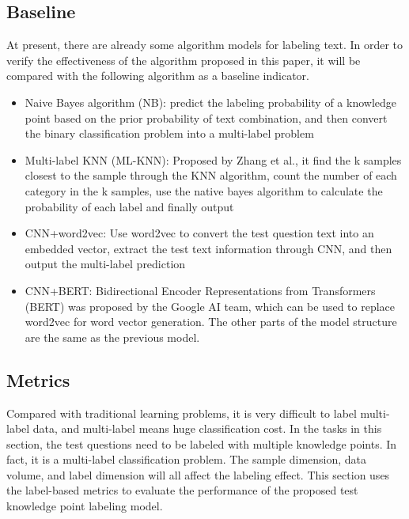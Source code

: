 \subsection{Baseline}
At present, there are already some algorithm models for labeling text. In order to verify the effectiveness of the algorithm proposed in this paper, it will be compared with the following algorithm as a baseline indicator.
\begin{itemize}
	\item Naive Bayes algorithm (NB): predict the labeling probability of a knowledge point based on the prior probability of text combination, and then convert the binary classification problem into a multi-label problem
	\item Multi-label KNN (ML-KNN): Proposed by Zhang et al.\cite{zhang2007ml}, it find the k samples closest to the sample through the KNN algorithm, count the number of each category in the k samples, use the native bayes algorithm to calculate the probability of each label and finally output
	\item CNN+word2vec: Use word2vec to convert the test question text into an embedded vector, extract the test text information through CNN, and then output the multi-label prediction
	\item CNN+BERT\@: Bidirectional Encoder Representations from Transformers (BERT) was proposed by the Google AI team\cite{devlin2019bert}, which can be used to replace word2vec for word vector generation. The other parts of the model structure are the same as the previous model.
\end{itemize}

\subsection{Metrics}
Compared with traditional learning problems, it is very difficult to label multi-label data, and multi-label means huge classification cost\cite{zhang2013review}. In the tasks in this section, the test questions need to be labeled with multiple knowledge points. In fact, it is a multi-label classification problem. The sample dimension, data volume, and label dimension will all affect the labeling effect. This section uses the label-based metrics to evaluate the performance of the proposed test knowledge point labeling model.

